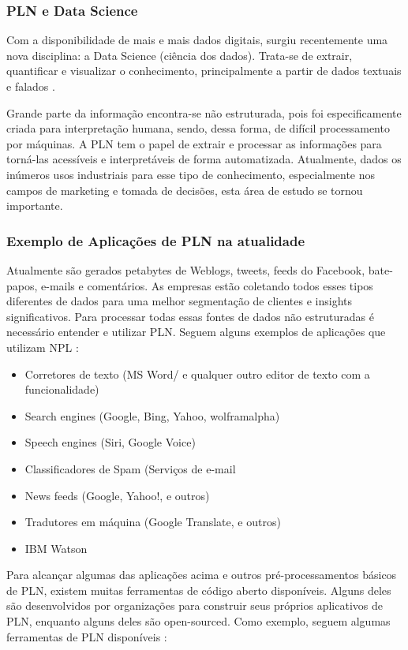 \documentclass[
	12pt,				%
	openright,			%
	oneside,			%
	a4paper,			%
	english,			%
	spanish,			%
	brazil				%
	]{abntex2}
\begin{document}
	\subsubsection*{PLN e Data Science}	
	Com a disponibilidade de mais e mais dados digitais, surgiu recentemente uma nova disciplina: a Data Science (ciência dos dados). Trata-se de extrair, quantificar e visualizar o conhecimento, principalmente a partir de dados textuais e falados \cite{book_natural_lang}. 
	
	Grande parte da informação encontra-se não estruturada, pois foi especificamente criada para interpretação humana, sendo, dessa forma, de difícil processamento por máquinas. A PLN tem o papel de extrair e processar as informações para torná-las acessíveis e interpretáveis de forma automatizada. Atualmente, dados os inúmeros usos industriais para esse tipo de conhecimento, especialmente nos campos de marketing e tomada de decisões, esta área de estudo se tornou importante.

	\subsubsection*{Exemplo de Aplicações de PLN na atualidade}
	Atualmente são gerados petabytes de Weblogs, tweets, feeds do Facebook, bate-papos, e-mails e comentários. As empresas estão coletando todos esses tipos diferentes de dados para uma melhor segmentação de clientes e insights significativos. Para processar todas essas fontes de dados não estruturadas é necessário entender e utilizar PLN.
Seguem alguns exemplos de aplicações que utilizam NPL \cite{book_natlang_python}:

	\begin{itemize}
	 	\item Corretores de texto (MS Word/ e qualquer outro editor de texto com a funcionalidade)
	 	\item Search engines (Google, Bing, Yahoo, wolframalpha)
	 	\item Speech engines (Siri, Google Voice)
	 	\item Classificadores de Spam (Serviços de e-mail
	 	\item News feeds (Google, Yahoo!, e outros)
	 	\item Tradutores em máquina (Google Translate, e outros)
	 	\item IBM Watson
	\end{itemize}

Para alcançar algumas das aplicações acima e outros pré-processamentos básicos de PLN, existem muitas ferramentas de código aberto disponíveis. Alguns deles são desenvolvidos por organizações para construir seus próprios aplicativos de PLN, enquanto alguns deles são open-sourced. Como exemplo, seguem algumas ferramentas de PLN disponíveis \cite{book_natlang_python}:
\end{document}
